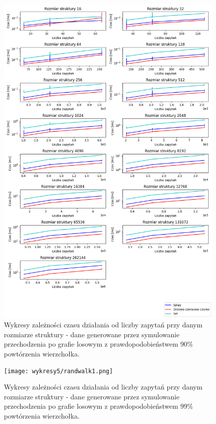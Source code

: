 \documentclass[declaration,shortabstract]{iithesis}
\theoremstyle{thm}
\theoremstyle{remark}
\theoremstyle{plain}
\theoremstyle{plain}
\theoremstyle{plain}
\begin{document}
\begin{figure}[H]  
\centering
    \includegraphics[scale=0.5]{wykresy3/randwalk10.png}
      \caption{Wykresy zależności czasu działania od liczby zapytań przy danym rozmiarze struktury - dane generowane przez symulowanie przechodzenia po grafie losowym z prawdopodobieństwem  \(90\%\) powtórzenia wierzchołka. }  
\end{figure}

\begin{figure}[H]  
\centering
    \texttt{[image: wykresy5/randwalk1.png]}
      \caption{Wykresy zależności czasu działania od liczby zapytań przy danym rozmiarze struktury - dane generowane przez symulowanie przechodzenia po grafie losowym z prawdopodobieństwem  \(99\%\) powtórzenia wierzchołka. }  
\end{figure}
\end{document}
